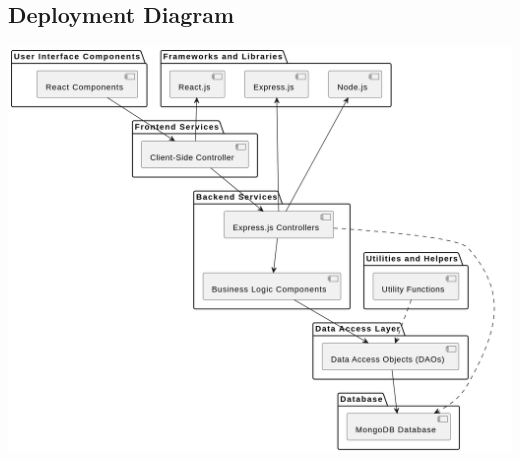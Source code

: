 \documentclass[a4paper, 12pt]{article}
\begin{document}
\subsection{Deployment Diagram}
\begin{center}
\includegraphics[width=1\textwidth]{deployment.png}\par
\end{center}
\end{document}

